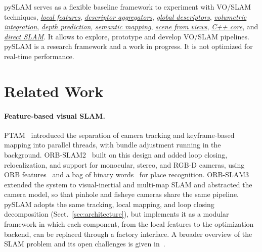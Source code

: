 \documentclass{article}
\let\oldparagraph\paragraph
\renewcommand{\paragraph}[1]{\oldparagraph{#1}\mbox{}}
\begin{document}
pySLAM serves as a flexible baseline framework to experiment with VO/SLAM
techniques, \emph{\protect\hyperlink{supported-local-features}{local
features}},
\emph{\protect\hyperlink{supported-global-descriptors-and-local-descriptor-aggregation-methods}{descriptor
aggregators}},
\emph{\protect\hyperlink{supported-global-descriptors-and-local-descriptor-aggregation-methods}{global
descriptors}},
\emph{\protect\hyperlink{volumetric-reconstruction-pipeline}{volumetric
integration}}, \emph{\protect\hyperlink{depth-prediction}{depth
prediction}}, \emph{\protect\hyperlink{semantic-mapping}{semantic
mapping}}, \emph{\protect\hyperlink{scene-from-views}{scene from views}}, \emph{\protect\hyperlink{cpp-core}{C++ core}}, and \emph{\protect\hyperlink{direct-slam}{direct SLAM}}. It allows to explore, prototype and develop VO/SLAM
pipelines. pySLAM is a research framework and a work in progress. It is
not optimized for real-time performance.


\hypertarget{related-work}{%
\section{Related Work}\label{related-work}}

\paragraph{Feature-based visual SLAM.}
PTAM~\cite{PTAM} introduced the separation of camera tracking and keyframe-based mapping into parallel threads, with bundle adjustment running in the background. ORB-SLAM2~\cite{ORB_SLAM2} built on this design and added loop closing, relocalization, and support for monocular, stereo, and RGB-D cameras, using ORB features~\cite{rublee2011orb} and a bag of binary words~\cite{galvez2012bags} for place recognition. ORB-SLAM3~\cite{campos2021orbslam3} extended the system to visual-inertial and multi-map SLAM and abstracted the camera model, so that pinhole and fisheye cameras share the same pipeline. pySLAM adopts the same tracking, local mapping, and loop closing decomposition (Sect.~\ref{sec:architecture}), but implements it as a modular framework in which each component, from the local features to the optimization backend, can be replaced through a factory interface. A broader overview of the SLAM problem and its open challenges is given in~\cite{cadena2017past}.
\end{document}
